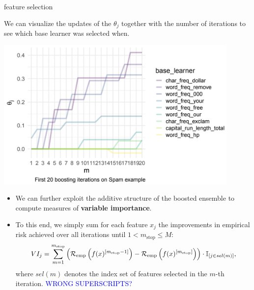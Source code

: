 
\begin{vbframe}{feature selection}

We can visualize the updates of the $\theta_j$ together with the number of 
iterations to see which base learner was selected when.

\vfill

\begin{center}
\includegraphics[width=0.9\textwidth]{figure_man/componentwise-gb.png}
\end{center}

\framebreak


\begin{itemize}
  \item We can further exploit the additive structure of the boosted ensemble to 
  compute measures of \textbf{variable importance}.
  \item To this end, we simply sum for each feature $x_j$ the improvements in 
  empirical risk achieved over all iterations until 
  $1 < m_{\text{stop}} \leq M$:
    $$VI_j = \sum_{m = 1}^{m_{\text{stop}}} \left( \mathcal{R}_{\text{emp}} \left(
    f(x)^{[m_{\text{stop}} - 1]} \right) - \mathcal{R}_{\text{emp}} \left(f(x)^{[m_{\text{stop}}]} 
    \right) \right) \cdot \mathbb{I}_{[j \in sel(m)]},$$
  where $sel(m)$ denotes the index set of features selected in the $m$-th 
  iteration. \textcolor{blue}{WRONG SUPERSCRIPTS?}
\end{itemize}

\framebreak



\end{vbframe}
